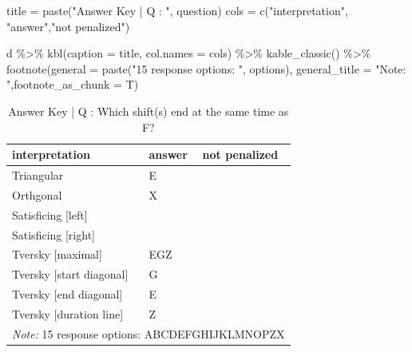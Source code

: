 \documentclass[
  letterpaper,
  DIV=11,
  numbers=noendperiod]{scrreprt}
\newenvironment{Shaded}{\begin{snugshade}}{\end{snugshade}}
\newcommand{\AttributeTok}[1]{\textcolor[rgb]{0.40,0.45,0.13}{#1}}
\newcommand{\FunctionTok}[1]{\textcolor[rgb]{0.28,0.35,0.67}{#1}}
\newcommand{\NormalTok}[1]{\textcolor[rgb]{0.00,0.23,0.31}{#1}}
\newcommand{\OtherTok}[1]{\textcolor[rgb]{0.00,0.23,0.31}{#1}}
\newcommand{\SpecialCharTok}[1]{\textcolor[rgb]{0.37,0.37,0.37}{#1}}
\newcommand{\StringTok}[1]{\textcolor[rgb]{0.13,0.47,0.30}{#1}}
\begin{document}
\begin{Shaded}
\begin{Highlighting}[]
\NormalTok{title }\OtherTok{=} \FunctionTok{paste}\NormalTok{(}\StringTok{"Answer Key | Q : "}\NormalTok{, question)}
\NormalTok{cols }\OtherTok{=} \FunctionTok{c}\NormalTok{(}\StringTok{"interpretation"}\NormalTok{, }\StringTok{"answer"}\NormalTok{,}\StringTok{"not penalized"}\NormalTok{)}

\NormalTok{d }\SpecialCharTok{\%\textgreater{}\%} \FunctionTok{kbl}\NormalTok{(}\AttributeTok{caption =}\NormalTok{ title, }\AttributeTok{col.names =}\NormalTok{ cols) }\SpecialCharTok{\%\textgreater{}\%} \FunctionTok{kable\_classic}\NormalTok{() }\SpecialCharTok{\%\textgreater{}\%}
  \FunctionTok{footnote}\NormalTok{(}\AttributeTok{general =} \FunctionTok{paste}\NormalTok{(}\StringTok{"15 response options: "}\NormalTok{, options), }\AttributeTok{general\_title =} \StringTok{"Note: "}\NormalTok{,}\AttributeTok{footnote\_as\_chunk =}\NormalTok{ T)}
\end{Highlighting}
\end{Shaded}

\begin{table}

\caption{Answer Key | Q :  Which shift(s) end at the same time as F?}
\centering
\begin{tabular}[t]{l|l|l}
\hline
interpretation & answer & not penalized\\
\hline
Triangular & E & \\
\hline
Orthgonal & X & \\
\hline
Satisficing [left] &  & \\
\hline
Satisficing [right] &  & \\
\hline
Tversky [maximal] & EGZ & \\
\hline
Tversky [start diagonal] & G & \\
\hline
Tversky [end diagonal] & E & \\
\hline
Tversky [duration line] & Z & \\
\hline
\multicolumn{3}{l}{\rule{0pt}{1em}\textit{Note: } 15 response options:  ABCDEFGHIJKLMNOPZX}\\
\end{tabular}
\end{table}
\end{document}
